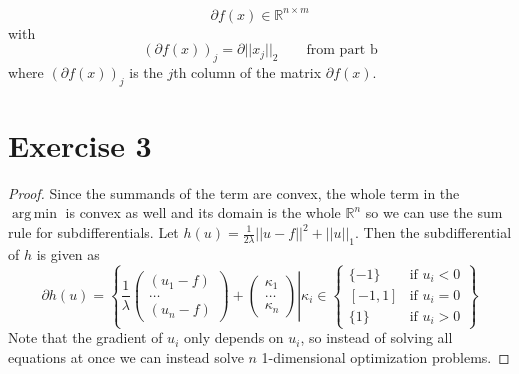 \documentclass[10pt,a4paper]{article}
\DeclareMathOperator{\argmin}{arg\,min}
\begin{document}
\begin{equation*}
  \partial f(x) \in \mathbb{R}^{n \times m}
\end{equation*}
with
\begin{equation*}
  (\partial f(x))_{j} = \partial ||x_{j}||_{2} \qquad \text{from part b}
\end{equation*}
where $(\partial f(x))_{j}$ is the $j$th column of the matrix $\partial f(x)$.

\section*{Exercise 3}

\begin{proof}
  Since the summands of the term are convex, the whole term in the $\argmin$ is convex as well and its domain is the whole $\mathbb{R}^{n}$ so we can use the sum rule for subdifferentials.
  Let $h(u) = \frac{1}{2\lambda}||u - f||^{2} + ||u||_{1}$.
  Then the subdifferential of $h$ is given as
  \begin{equation*}
    \partial h(u) = \left\{\left. \frac{1}{\lambda} \begin{pmatrix}
        (u_{1} - f)\\
        \hdots\\
        (u_{n} - f)
      \end{pmatrix} + \begin{pmatrix}
        \kappa_{1}\\
        \hdots\\
        \kappa_{n}
      \end{pmatrix} \right| \kappa_{i} \in \begin{cases}
        \{ -1 \} & \text{if $u_{i} < 0$}\\
        [-1, 1] & \text{if $u_{i} = 0$}\\
        \{ 1 \} & \text{if $u_{i} > 0$}
      \end{cases}
    \right\}
  \end{equation*}
  Note that the gradient of $u_{i}$ only depends on $u_{i}$, so instead of solving all equations at once we can instead solve $n$ 1-dimensional optimization problems.


\end{proof}
\end{document}

